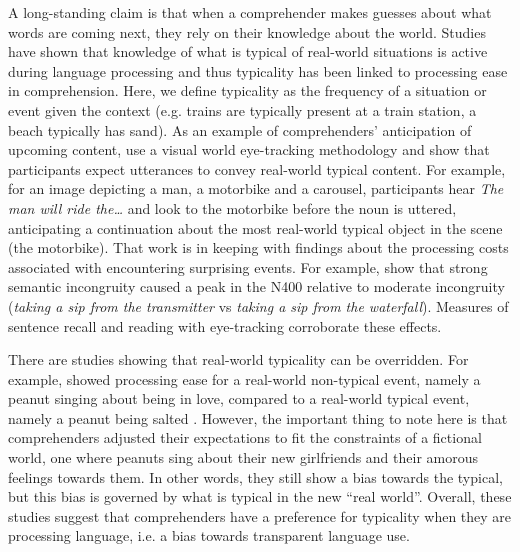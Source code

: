 \documentclass[output=paper,colorlinks,citecolor=brown]{langscibook}
\begin{document}
A long-standing claim is that when a comprehender makes guesses about what words are coming next, they rely on their knowledge about the world. Studies have shown that knowledge of what is typical of real-world situations is active during language processing and thus typicality has been linked to processing ease in comprehension. Here, we define typicality as the frequency of a situation or event given the context (e.g. trains are typically present at a train station, a beach typically has sand). As an example of comprehenders' anticipation of upcoming content, \citet{KamideHaywood2003} use a visual world eye-tracking methodology and show that participants expect utterances to convey real-world typical content. For example, for an image depicting a man, a motorbike and a carousel, participants hear \textit{The man will ride the\dots} and look to the motorbike before the noun is uttered, anticipating a continuation about the most real-world typical object in the scene (the motorbike). That work is in keeping with findings about the processing costs associated with encountering surprising events. For example, \citet{KutasHillyard1980} show that strong semantic incongruity caused a peak in the N400 relative to moderate incongruity (\textit{taking a sip from the transmitter} vs \textit{taking a sip from the waterfall}). Measures of sentence recall \citep{MarksMiller1964} and reading with eye-tracking \citep{Morris1994} corroborate these effects.

There are studies showing that real-world typicality can be overridden. For example, \citet{NieuwlandVanBerkum2006} showed processing ease for a real-world non-typical event, namely a peanut singing about being in love, compared to a real-world typical event, namely a peanut being salted \citep[see also][]{TroyerKutas2020}. However, the important thing to note here is that comprehenders adjusted their expectations to fit the constraints of a fictional world, one where peanuts sing about their new girlfriends and their amorous feelings towards them. In other words, they still show a bias towards the typical, but this bias is governed by what is typical in the new ``real world''. Overall, these studies suggest that comprehenders have a preference for typicality when they are processing language, i.e. a bias towards transparent language use.
 
\end{document}

